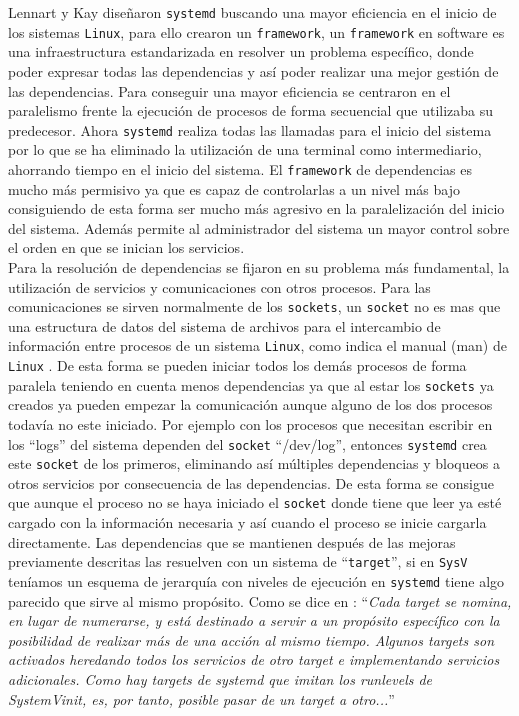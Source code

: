 Lennart y Kay diseñaron \texttt{systemd} buscando una mayor eficiencia en el inicio de los sistemas \texttt{Linux}, para ello crearon un \texttt{framework}, un \texttt{framework} en software es una infraestructura estandarizada en resolver un problema específico, donde poder expresar todas las dependencias y así poder realizar una mejor gestión de las dependencias. Para conseguir una mayor eficiencia se centraron en el paralelismo frente la ejecución de procesos de forma secuencial que utilizaba su predecesor. Ahora \texttt{systemd} realiza todas las llamadas para el inicio del sistema por lo que se ha eliminado la utilización de una terminal como intermediario, ahorrando tiempo en el inicio del sistema. El \texttt{framework} de dependencias es mucho más permisivo ya que es capaz de controlarlas a un nivel más bajo consiguiendo de esta forma ser mucho más agresivo en la paralelización del inicio del sistema. Además permite al administrador del sistema un mayor control sobre el orden en que se inician los servicios.\\

Para la resolución de dependencias se fijaron en su problema más fundamental, la utilización de servicios y comunicaciones con otros procesos. Para las comunicaciones se sirven normalmente de los \texttt{sockets}, un \texttt{socket} no es mas que una estructura de datos del sistema de archivos para el intercambio de información entre procesos de un sistema \texttt{Linux}, como indica el manual (man) de \texttt{Linux} \cite{socket}. De esta forma se pueden iniciar todos los demás procesos de forma paralela teniendo en cuenta menos dependencias ya que al estar los \texttt{sockets} ya creados ya pueden empezar la comunicación aunque alguno de los dos procesos todavía no este iniciado. Por ejemplo con los procesos que necesitan escribir en los ``logs'' del sistema dependen del \texttt{socket} ``/dev/log'', entonces \texttt{systemd} crea este \texttt{socket} de los primeros, eliminando así múltiples dependencias y bloqueos a otros servicios por consecuencia de las dependencias. De esta forma se consigue que aunque el proceso no se haya iniciado el \texttt{socket} donde tiene que leer ya esté cargado con la información necesaria y así cuando el proceso se inicie cargarla directamente. Las dependencias que se mantienen después de las mejoras previamente descritas las resuelven con un sistema de ``\texttt{target}'', si en \texttt{SysV} teníamos un esquema de jerarquía con niveles de ejecución en \texttt{systemd} tiene algo parecido que sirve al mismo propósito. Como se dice en \cite{systemd_es}: ``\textit{Cada target se nomina, en lugar de numerarse, y está destinado a servir a un propósito específico con la posibilidad de realizar más de una acción al mismo tiempo. Algunos targets son activados heredando todos los servicios de otro target e implementando servicios adicionales. Como hay targets de systemd que imitan los runlevels de SystemVinit, es, por tanto, posible pasar de un target a otro...}''


